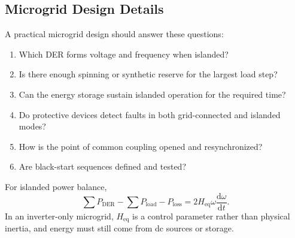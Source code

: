 \documentclass[11pt]{article}
\newcommand{\dd}{\mathrm{d}}
\begin{document}
\subsection{Microgrid Design Details}
A practical microgrid design should answer these questions:
\begin{enumerate}
  \item Which DER forms voltage and frequency when islanded?
  \item Is there enough spinning or synthetic reserve for the largest load step?
  \item Can the energy storage sustain islanded operation for the required time?
  \item Do protective devices detect faults in both grid-connected and islanded
  modes?
  \item How is the point of common coupling opened and resynchronized?
  \item Are black-start sequences defined and tested?
\end{enumerate}
For islanded power balance,
\begin{equation}
\sum P_{\mathrm{DER}}-\sum P_{\mathrm{load}}-P_{\mathrm{loss}}
=2H_{\mathrm{eq}}\omega\frac{\dd \omega}{\dd t}.
\end{equation}
In an inverter-only microgrid, $H_{\mathrm{eq}}$ is a control parameter rather
than physical inertia, and energy must still come from dc sources or storage.
\end{document}
